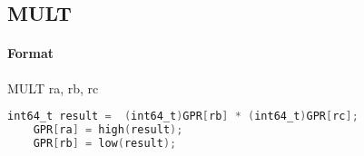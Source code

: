 \subsection{MULT}


\paragraph{Format} MULT ra, rb, rc

\begin{lstlisting}[language=C]
    int64_t result =  (int64_t)GPR[rb] * (int64_t)GPR[rc];
    GPR[ra] = high(result);
    GPR[rb] = low(result);
\end{lstlisting}
